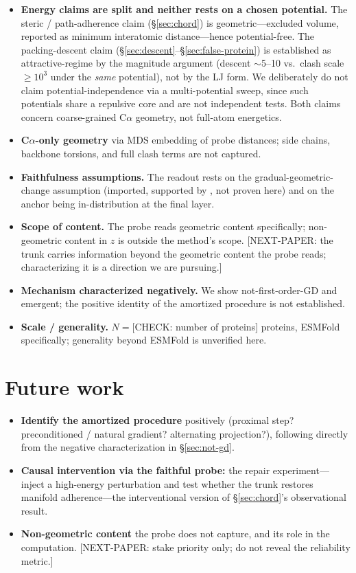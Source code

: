 \documentclass[11pt]{article}
\newcommand{\CHECK}[1]{{\color{orange!80!black}\small\textsf{[CHECK: #1]}}}
\newcommand{\NEXTPAPER}[1]{{\color{gray}\small\textsf{[NEXT-PAPER: #1]}}}
\begin{document}
\begin{itemize}[leftmargin=1.3em,itemsep=3pt]
\item \textbf{Energy claims are split and neither rests on a chosen potential.}
  The steric / path-adherence claim (\S\ref{sec:chord}) is geometric---excluded
  volume, reported as minimum interatomic distance---hence potential-free. The
  packing-descent claim (\S\ref{sec:descent}--\S\ref{sec:false-protein}) is
  established as attractive-regime by the magnitude argument (descent $\sim$5--10
  vs.\ clash scale $\geq 10^3$ under the \emph{same} potential), not by the LJ
  form. We deliberately do not claim potential-independence via a multi-potential
  sweep, since such potentials share a repulsive core and are not independent
  tests. Both claims concern coarse-grained C$\alpha$ geometry, not full-atom
  energetics.
\item \textbf{C$\alpha$-only geometry} via MDS embedding of probe distances; side
  chains, backbone torsions, and full clash terms are not captured.
\item \textbf{Faithfulness assumptions.} The readout rests on the
  gradual-geometric-change assumption (imported, supported by \citet{lu2026phase},
  not proven here) and on the anchor being in-distribution at the final layer.
\item \textbf{Scope of content.} The probe reads geometric content specifically;
  non-geometric content in $z$ is outside the method's scope.
  \NEXTPAPER{the trunk carries information beyond the geometric content the probe
  reads; characterizing it is a direction we are pursuing.}
\item \textbf{Mechanism characterized negatively.} We show not-first-order-GD and
  emergent; the positive identity of the amortized procedure is not established.
\item \textbf{Scale / generality.} $N=$\CHECK{number of proteins} proteins,
  ESMFold specifically; generality beyond ESMFold is unverified here.
\end{itemize}

\section{Future work}
\label{sec:future}

\begin{itemize}[leftmargin=1.3em,itemsep=3pt]
\item \textbf{Identify the amortized procedure} positively (proximal step?
  preconditioned / natural gradient? alternating projection?), following directly
  from the negative characterization in \S\ref{sec:not-gd}.
\item \textbf{Causal intervention via the faithful probe:} the repair
  experiment---inject a high-energy perturbation and test whether the trunk
  restores manifold adherence---the interventional version of \S\ref{sec:chord}'s
  observational result.
\item \textbf{Non-geometric content} the probe does not capture, and its role in
  the computation.
  \NEXTPAPER{stake priority only; do not reveal the reliability metric.}
\end{itemize}
\end{document}
